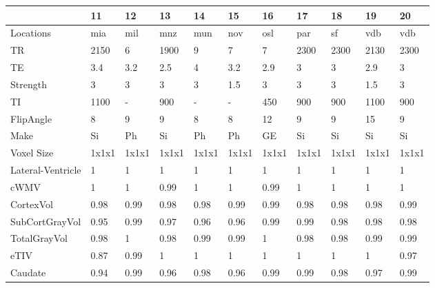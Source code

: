 \begin{table}
[]
\centering
\begin{tabular}{lllllllllll}
\toprule
{} &     11 &     12 &     13 &     14 &     15 &     16 &     17 &     18 &     19 &     20 \\
\midrule
Locations & mia & mil & mnz & mun & nov & osl & par & sf & vdb & vdb\\
\midrule
TR                            &   2150 &      6 &   1900 &      9 &      7 &      7 &   2300 &   2300 &   2130 &   2300 \\
TE                            &    3.4 &    3.2 &    2.5 &      4 &    3.2 &    2.9 &      3 &      3 &    2.9 &      3 \\
Strength                      &      3 &      3 &      3 &      3 &    1.5 &      3 &      3 &      3 &    1.5 &      3 \\
TI                            &   1100 &      - &    900 &      - &      - &    450 &    900 &    900 &   1100 &    900 \\
FlipAngle                     &      8 &      9 &      9 &      8 &      8 &     12 &      9 &      9 &     15 &      9 \\
Make                          &     Si &     Ph &     Si &     Ph &     Ph &     GE &     Si &     Si &     Si &     Si \\
Voxel Size                    &  1x1x1 &  1x1x1 &  1x1x1 &  1x1x1 &  1x1x1 &  1x1x1 &  1x1x1 &  1x1x1 &  1x1x1 &  1x1x1 \\
\bottomrule
Lateral-Ventricle             &      1 &      1 &      1 &      1 &      1 &      1 &      1 &      1 &      1 &      1 \\
cWMV        &      1 &      1 &   0.99 &      1 &      1 &   0.99 &      1 &      1 &      1 &      1 \\
CortexVol                     &   0.98 &   0.99 &   0.98 &   0.98 &   0.99 &   0.99 &   0.98 &   0.98 &   0.98 &   0.99 \\
SubCortGrayVol                &   0.95 &   0.99 &   0.97 &   0.96 &   0.96 &   0.99 &   0.99 &   0.98 &   0.98 &   0.98 \\
TotalGrayVol                  &   0.98 &      1 &   0.98 &   0.99 &   0.99 &      1 &   0.98 &   0.98 &   0.99 &   0.99 \\
eTIV &   0.87 &   0.99 &      1 &      1 &      1 &      1 &      1 &      1 &      1 &   0.97 \\
Caudate                       &   0.94 &   0.99 &   0.96 &   0.98 &   0.96 &   0.99 &   0.99 &   0.98 &   0.97 &   0.99 \\

\end{tabular}
\end{table}
